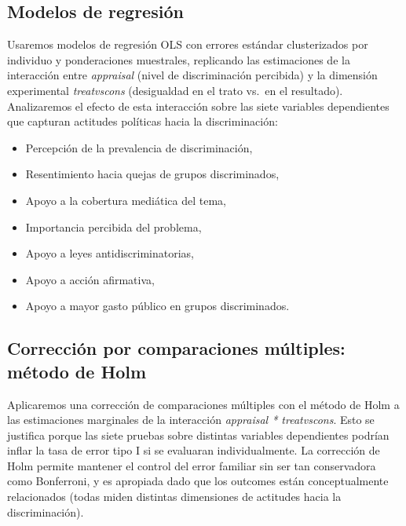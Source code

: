 \documentclass[
  13pt,
  a4paper,
]{article}
\providecommand{\tightlist}{%
  \setlength{\itemsep}{0pt}\setlength{\parskip}{0pt}}
\begin{document}
\hypertarget{modelos-de-regresiuxf3n}{%
\subsection{Modelos de regresión}\label{modelos-de-regresiuxf3n}}

Usaremos modelos de regresión OLS con errores estándar clusterizados por individuo y ponderaciones muestrales, replicando las estimaciones de la interacción entre \emph{appraisal} (nivel de discriminación percibida) y la dimensión experimental \emph{treatvscons} (desigualdad en el trato vs.~en el resultado). Analizaremos el efecto de esta interacción sobre las siete variables dependientes que capturan actitudes políticas hacia la discriminación:

\begin{itemize}
\tightlist
\item
  Percepción de la prevalencia de discriminación,
\item
  Resentimiento hacia quejas de grupos discriminados,
\item
  Apoyo a la cobertura mediática del tema,
\item
  Importancia percibida del problema,
\item
  Apoyo a leyes antidiscriminatorias,
\item
  Apoyo a acción afirmativa,
\item
  Apoyo a mayor gasto público en grupos discriminados.
\end{itemize}

\hypertarget{correcciuxf3n-por-comparaciones-muxfaltiples-muxe9todo-de-holm}{%
\subsection{Corrección por comparaciones múltiples: método de Holm}\label{correcciuxf3n-por-comparaciones-muxfaltiples-muxe9todo-de-holm}}

Aplicaremos una corrección de comparaciones múltiples con el método de Holm a las estimaciones marginales de la interacción \emph{appraisal * treatvscons}. Esto se justifica porque las siete pruebas sobre distintas variables dependientes podrían inflar la tasa de error tipo I si se evaluaran individualmente. La corrección de Holm permite mantener el control del error familiar sin ser tan conservadora como Bonferroni, y es apropiada dado que los outcomes están conceptualmente relacionados (todas miden distintas dimensiones de actitudes hacia la discriminación).
\end{document}
